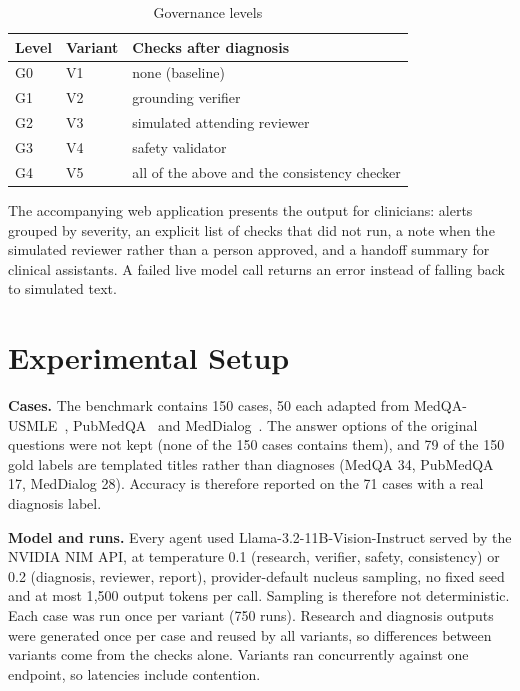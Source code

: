 \documentclass[conference]{IEEEtran}
\begin{document}
\begin{table}[htbp]
\centering
\caption{Governance levels}
\label{tab:levels}
\begin{tabular}{lll}
\toprule
\textbf{Level} & \textbf{Variant} & \textbf{Checks after diagnosis} \\
\midrule
G0 & V1 & none (baseline) \\
G1 & V2 & grounding verifier \\
G2 & V3 & simulated attending reviewer \\
G3 & V4 & safety validator \\
G4 & V5 & all of the above and the consistency checker \\
\bottomrule
\end{tabular}
\end{table}

The accompanying web application presents the output for clinicians: alerts grouped by severity, an explicit list
of checks that did not run, a note when the simulated reviewer rather than a person approved, and a handoff summary
for clinical assistants. A failed live model call returns an error instead of falling back to simulated text.

\section{Experimental Setup}
\textbf{Cases.} The benchmark contains 150 cases, 50 each adapted from MedQA-USMLE~\cite{jin2021medqa},
PubMedQA~\cite{jin2019pubmedqa} and MedDialog~\cite{zeng2020meddialog}. The answer options of the original questions
were not kept (none of the 150 cases contains them), and 79 of the 150 gold labels are templated titles rather than
diagnoses (MedQA 34, PubMedQA 17, MedDialog 28). Accuracy is therefore reported on the 71 cases with a real
diagnosis label.

\textbf{Model and runs.} Every agent used Llama-3.2-11B-Vision-Instruct served by the NVIDIA NIM API, at temperature
0.1 (research, verifier, safety, consistency) or 0.2 (diagnosis, reviewer, report), provider-default nucleus sampling,
no fixed seed and at most 1{,}500 output tokens per call. Sampling is therefore not deterministic. Each case was
run once per variant (750 runs). Research and diagnosis outputs were generated once per case and reused by all
variants, so differences between variants come from the checks alone. Variants ran concurrently against one
endpoint, so latencies include contention.
\end{document}
